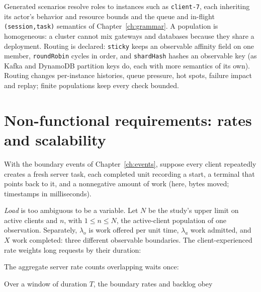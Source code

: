Generated scenarios resolve roles to instances such as \texttt{client-7}, each
inheriting its actor's behavior and resource bounds and the queue and in-flight
\texttt{(session,task)} semantics of Chapter~\ref{ch:grammar}. A population is
homogeneous: a cluster cannot mix gateways and databases because they share a
deployment. Routing is declared: \texttt{sticky} keeps an observable affinity
field on one member, \texttt{roundRobin} cycles in order, and \texttt{shardHash}
hashes an observable key (as Kafka and DynamoDB partition keys do, each with more
semantics of its own). Routing changes per-instance histories, queue pressure,
hot spots, failure impact and replay; finite populations keep every check
bounded.

\section{Non-functional requirements: rates and scalability}

With the boundary events of Chapter~\ref{ch:events}, suppose every client
repeatedly creates a fresh server task, each completed unit recording a start, a
terminal that points back to it, and a nonnegative amount of work (here, bytes
moved; timestamps in milliseconds).

\emph{Load} is too ambiguous to be a variable. Let $N$ be the study's upper
limit on active clients and $n$, with $1\leq n\leq N$, the active-client
population of one observation. Separately, $\lambda_o$ is work offered per unit
time, $\lambda_a$ work admitted, and $X$ work completed: three different
observable boundaries. The client-experienced rate weights long requests by their
duration:


The aggregate server rate counts overlapping waits once:


Over a window of duration $T$, the boundary rates and backlog obey

